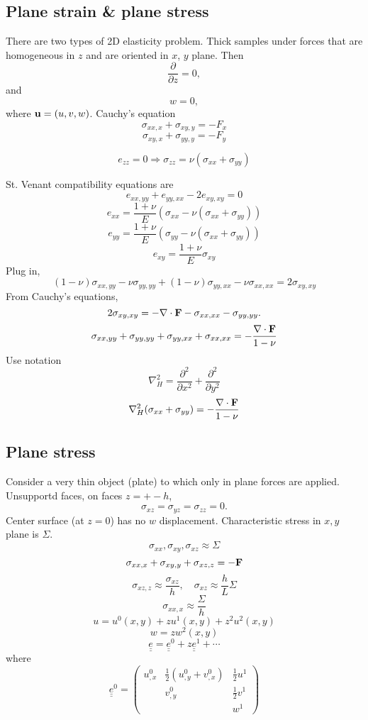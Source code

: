 \documentclass[12pt]{article}
\newcommand{\uu}{{\bf u}}
\newcommand{\FF}{{\bf F}}
\newcommand{\te}{{\underline{\underline e}}}
\newcommand{\mx}[1]{\begin{pmatrix}#1\end{pmatrix}}
\begin{document}
\subsection{Plane strain \& plane stress}
There are two types of 2D elasticity problem. Thick samples under forces that are homogeneous in $z$ and are oriented in $x$, $y$ plane. Then
\[
\frac{\partial}{\partial z}=0,
\]
and 
\[
w=0,
\]
where $\uu = (u,v,w)$.
Cauchy's equation
\[
\sigma_{xx,x} + \sigma_{xy,y} =-F_x
\] 
\[
\sigma_{xy,x} + \sigma_{yy,y} =-F_y
\] 

\[
e_{zz} = 0 \Rightarrow \sigma_{zz} = \nu(\sigma_{xx} + \sigma_{yy})
\]

St. Venant compatibility equations are 
\[
e_{xx,yy} + e_{yy,xx} - 2e_{xy,xy}=0
\]
\[
e_{xx} = \frac{1+\nu}{E} (\sigma_{xx}-\nu(\sigma_{xx} + \sigma_{yy} ))
\]
\[
e_{yy} = \frac{1+\nu}{E} (\sigma_{yy}-\nu(\sigma_{xx} + \sigma_{yy} ))
\]
\[
e_{xy} = \frac{1+\nu}{E}\sigma_{xy}
\]
Plug in,
\[
(1-\nu)\sigma_{xx,yy} - \nu\sigma_{yy,yy} + (1-\nu)\sigma_{yy,xx}-\nu\sigma_{xx,xx} = 2\sigma_{xy,xy}
\]
From Cauchy's equations,
\[
2\sigma_{xy,xy} = -\nabla\cdot\FF - \sigma_{xx,xx}-\sigma_{yy,yy}.
\]
\[
\sigma_{xx,yy} + \sigma_{yy,yy}  + \sigma_{yy,xx}  + \sigma_{xx,xx} = -\frac{\nabla\cdot\FF}{1-\nu} 
\]
Use notation
\[
\nabla_H^2 = \frac{\partial^2}{\partial x^2} + \frac{\partial^2}{\partial y^2}
\]
\[
\nabla_H^2 (\sigma_{xx}+\sigma_{yy})= -\frac{\nabla\cdot\FF}{1-\nu} 
\]

\subsection{Plane stress}
Consider a very thin object (plate) to which only in plane forces are applied.
Unsupportd faces, on faces $z=+-h$,
\[
\sigma_{xz} = \sigma_{yz} = \sigma_{zz}=0.
\]
Center surface (at $z=0$) has no $w$ displacement. Characteristic stress in $x, y$ plane is $\Sigma$.
\[
\sigma_{xx}, \sigma_{xy}, \sigma_{xz}\approx \Sigma 
\]
\[
\sigma_{xx,x} +  \sigma_{xy,y}+  \sigma_{xz,z} = - \FF 
\]
\[
\sigma_{xz,z} \approx \frac{\sigma_{xz}}{h},\quad  \sigma_{xz}\approx \frac h L \Sigma
\]
\[
\sigma_{xx,x} \approx \frac{\Sigma}{h}
\]
\[
u = u^0 (x,y) + z u^1 (x,y) + z^2 u^2(x,y)
\]
\[
w = zw^2(x,y)
\]
\[
\te = \te^0 + z\te^1+\cdots
\]
where 
\[
\te^0 = \mx{ u^0_{,x} & \frac1  2 (u^0_{,y} + v^0_{,x}) & \frac 1 2 u^1\\
& v^0_{,y} & \frac 1 2 v^1\\
& & w^1
}
\]
\end{document}
